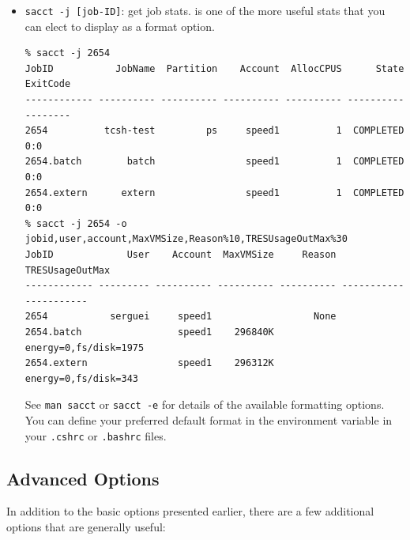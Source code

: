 \begin{itemize}
\item
\texttt{sacct -j [job-ID]}: get job stats.
 is one of the more useful stats that you can elect to display
as a format option.

\small
\begin{verbatim}
% sacct -j 2654
JobID           JobName  Partition    Account  AllocCPUS      State ExitCode
------------ ---------- ---------- ---------- ---------- ---------- --------
2654          tcsh-test         ps     speed1          1  COMPLETED      0:0
2654.batch        batch                speed1          1  COMPLETED      0:0
2654.extern      extern                speed1          1  COMPLETED      0:0
% sacct -j 2654 -o jobid,user,account,MaxVMSize,Reason%10,TRESUsageOutMax%30
JobID             User    Account  MaxVMSize     Reason        TRESUsageOutMax
------------ --------- ---------- ---------- ---------- ----------------------
2654           serguei     speed1                  None
2654.batch                 speed1    296840K             energy=0,fs/disk=1975
2654.extern                speed1    296312K              energy=0,fs/disk=343
\end{verbatim}
\normalsize

See \texttt{man sacct} or \texttt{sacct -e} for details of the
available formatting options. You can define your preferred
default format in the  environment variable
in your \texttt{.cshrc} or \texttt{.bashrc} files.

\end{itemize}


\subsection{Advanced  Options}
\label{sect:submit-options}
\label{sect:qsub-options}

In addition to the basic  options presented earlier, there are a 
few additional options that are generally useful:

